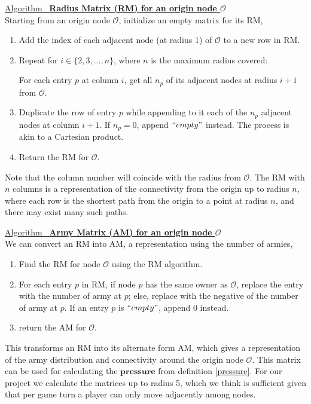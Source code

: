 \documentclass[12pt]{article}  %
\newcommand{\algtitle}[1]{\underline{Algorithm \ {\bf #1}} \vspace*{1mm}\\}
\begin{document}
\algtitle{Radius Matrix (RM) for an origin node $\mathcal{O}$}
Starting from an origin node $\mathcal{O}$, initialize an empty matrix for its RM,
\begin{enumerate}
	\item Add the index of each adjacent node (at radius 1) of $\mathcal{O}$ to a new row in RM.
	\item Repeat for $i \in \{2,3,...,n\}$, where $n$ is the maximum radius covered:
	
	For each entry $p$ at column $i$, get all $n_p$ of its adjacent nodes at radius $i+1$ from $\mathcal{O}$. 

	\item Duplicate the row of entry $p$ while appending to it each of the $n_p$ adjacent nodes at column $i+1$. If $n_p=0$, append $``empty"$ instead. The process is akin to a Cartesian product.

	\item Return the RM for $\mathcal{O}$.
\end{enumerate}

Note that the column number will coincide with the radius from $\mathcal{O}$. The RM with $n$ columns is a representation of the connectivity from the origin up to radius $n$, where each row is the shortest path from the origin to a point at radius $n$, and there may exist many such paths.

\algtitle{Army Matrix (AM) for an origin node $\mathcal{O}$}
We can convert an RM into AM, a representation using the number of armies,
\begin{enumerate}
	\item Find the RM for node $\mathcal{O}$ using the RM algorithm.
	\item For each entry $p$ in RM, if node $p$ has the same owner as $\mathcal{O}$, replace the entry with the number of army at $p$; else, replace with the negative of the number of army at $p$. If an entry $p$ is $``empty"$, append 0 instead.
	\item return the AM for $\mathcal{O}$.
\end{enumerate}


This transforms an RM into its alternate form AM, which gives a representation of the army distribution and connectivity around the origin node $\mathcal{O}$. This matrix can be used for calculating the $\textbf{pressure}$ from definition \ref{pressure}. For our project we calculate the matrices up to radius 5, which we think is sufficient given that per game turn a player can only move adjacently among nodes.
\end{document}
